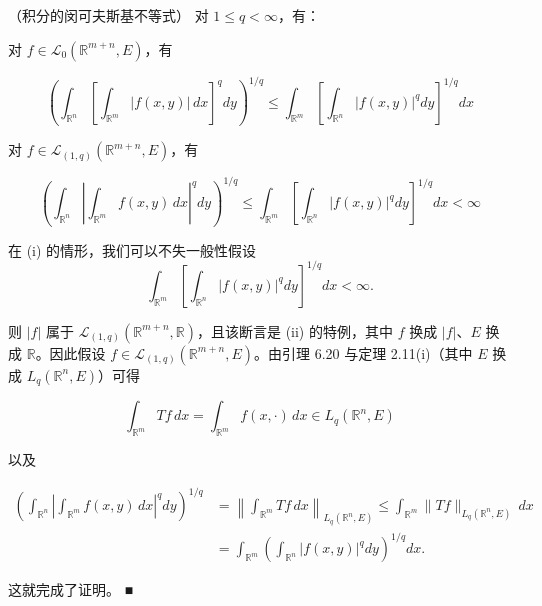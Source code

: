 \begin{proposition}

（积分的闵可夫斯基不等式） 对 $ 1 \le q < \infty $，有：

\begin{subitems}
\item

对 $ f \in \mathcal{L}_{0}(\mathbb{R}^{m+n},E) $，有

\[
\left(\int_{\mathbb{R}^{n}}\left[\int_{\mathbb{R}^{m}}|f(x,y)|\,dx\right]^{q}dy\right)^{1/q} \le \int_{\mathbb{R}^{m}}\left[\int_{\mathbb{R}^{n}}|f(x,y)|^{q}dy\right]^{1/q}dx
\]
\item

对 $ f \in \mathcal{L}_{(1,q)}(\mathbb{R}^{m+n},E) $，有

\[
\left(\int_{\mathbb{R}^{n}}\left|\int_{\mathbb{R}^{m}}f(x,y)\,dx\right|^{q}dy\right)^{1/q} \le \int_{\mathbb{R}^{m}}\left[\int_{\mathbb{R}^{n}}|f(x,y)|^{q}dy\right]^{1/q}dx < \infty
\]

\proofhead
在 (i) 的情形，我们可以不失一般性假设
\[
\int_{\mathbb{R}^{m}}\left[\int_{\mathbb{R}^{n}}|f(x,y)|^{q}dy\right]^{1/q}dx < \infty .
\]

则 $ |f| $ 属于 $ \mathcal{L}_{(1,q)}(\mathbb{R}^{m+n},\mathbb{R}) $，且该断言是 (ii) 的特例，其中 $ f $ 换成 $ |f| $、$ E $ 换成 $ \mathbb{R} $。因此假设 $ f \in \mathcal{L}_{(1,q)}(\mathbb{R}^{m+n},E) $。由引理 6.20 与定理 2.11(i)（其中 $ E $ 换成 $ L_{q}(\mathbb{R}^{n},E) $）可得

\[
\int_{\mathbb{R}^{m}}Tf\,dx = \int_{\mathbb{R}^{m}}f(x,\cdot)\,dx \in L_{q}(\mathbb{R}^{n},E)
\]

以及

\begin{equation*}
\begin{aligned}
\left(\int_{\mathbb{R}^{n}}\left|\int_{\mathbb{R}^{m}}f(x,y)\,dx\right|^{q}dy\right)^{1/q} &= \left\|\int_{\mathbb{R}^{m}}Tf\,dx\right\|_{L_{q}(\mathbb{R}^{n},E)} \le \int_{\mathbb{R}^{m}}\|Tf\|_{L_{q}(\mathbb{R}^{n},E)}\,dx \\ &= \int_{\mathbb{R}^{m}}\left(\int_{\mathbb{R}^{n}}|f(x,y)|^{q}dy\right)^{1/q}dx .
\end{aligned}
\end{equation*}

这就完成了证明。 \nobreak\hspace{0.35em}■

\end{subitems}

\end{proposition}

